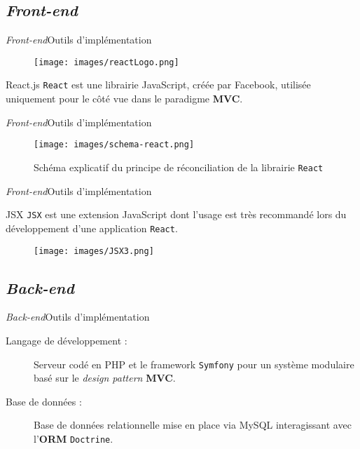 \documentclass[usenames,dvipsnames]{beamer}
\begin{document}
\subsection{\protect\textit{Front-end}}
\begin{frame}{\textit{Front-end}}{Outils d'implémentation}
  \begin{figure}
    \begin{center}
      \texttt{[image: images/reactLogo.png]}
    \end{center}
  \end{figure}
\begin{block}{React.js}
\texttt{React} est une librairie JavaScript, créée par Facebook, utilisée uniquement pour le côté \og vue \fg dans le paradigme \textbf{MVC}.
\end{block}
\end{frame}

\begin{frame}{\textit{Front-end}}{Outils d'implémentation}
\begin{figure}
  \texttt{[image: images/schema-react.png]}
  \caption{Schéma explicatif du principe de réconciliation de la librairie \texttt{React}}
\end{figure}
\end{frame}

\begin{frame}{\textit{Front-end}}{Outils d'implémentation}
  \begin{block}{JSX}
    \texttt{JSX} est une extension JavaScript dont l'usage est très recommandé lors du développement d'une application \texttt{React}.
  \end{block}
  \begin{figure}[!ht]
    \centering
    \texttt{[image: images/JSX3.png]}
  \end{figure}
\end{frame}

\subsection{\protect\textit{Back-end}}
\begin{frame}{\textit{Back-end}}{Outils d'implémentation}
  \begin{description}
    \item[Langage de développement :] Serveur codé en PHP et le framework \texttt{Symfony} pour un système modulaire basé sur le \textit{design pattern} \textbf{MVC}.
    \item[Base de données :] Base de données relationnelle mise en place via MySQL interagissant avec l'\textbf{ORM} \texttt{Doctrine}.
  \end{description}
\end{frame}
\end{document}
